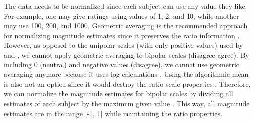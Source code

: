 %
The data needs to be normalized since each subject can use any value they like.
%
For example, one may give ratings using values of 1, 2, and 10, while another may use 100, 200, and 1000.
%
Geometric averaging is the recommended approach for normalizing magnitude estimates since it preserves the ratio information \citep{moskowitz1977magnitude, mcgee2004master, maddalena2017crowdsourcing}.
%
However, as opposed to the unipolar scales (with only positive values) used by \citet{bard1996magnitude, mcgee2004master} and \citet{maddalena2017crowdsourcing}, we cannot apply geometric averaging to bipolar scales (disagree-agree).
%
By including 0 (neutral) and negative values (disagree), we cannot use geometric averaging anymore because it uses log calculations \citep{moskowitz1977magnitude}.
%
Using the algorithmic mean is also not an option since it would destroy the ratio scale properties \citep{moskowitz1977magnitude}.
%
Therefore, we can normalize the magnitude estimates for bipolar scales by dividing all estimates of each subject by the maximum given value \citep{moskowitz1977magnitude}.
%
This way, all magnitude estimates are in the range [-1, 1] while maintaining the ratio properties.
%

